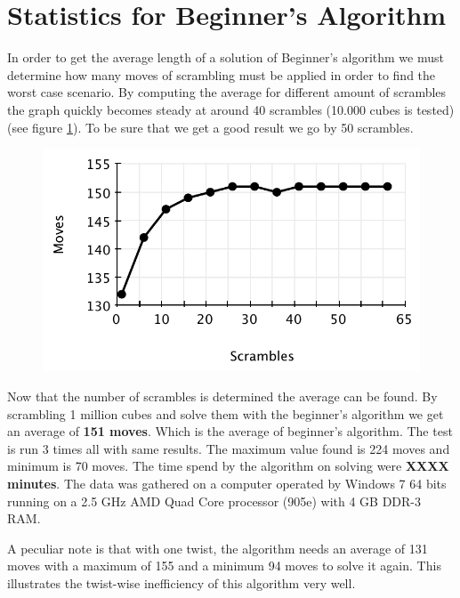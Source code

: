 \section{Statistics for Beginner's Algorithm}
\label{sec:beginnersStat}
In order to get the average length of a solution of Beginner's algorithm we must determine how many moves of scrambling must be applied in order to find the worst case scenario. 
By computing the average for different amount of scrambles the graph quickly becomes steady at around 40 scrambles (10.000 cubes is tested) (see figure \ref{fig:beginnersScramble}). To be sure that we get a good result we go by 50 scrambles.
\begin{figure}[htbp]
	\centering
		\includegraphics{input/pics/beginnersScramble.pdf}
	\caption{}
	\label{fig:beginnersScramble}
\end{figure}

Now that the number of scrambles is determined the average can be found.
By scrambling 1 million cubes and solve them with the beginner's algorithm we get an average of \textbf{151 moves}. 
Which is the average of beginner's algorithm. The test is run 3 times all with same results.
The maximum value found is 224 moves and minimum is 70 moves. 
The time spend by the algorithm on solving were \textbf{XXXX minutes}. 
The data was gathered on a computer operated by Windows 7 64 bits running on a 2.5 GHz AMD Quad Core processor (905e) with 4 GB DDR-3 RAM.

A peculiar note is that with one twist, the algorithm needs an average of 131 moves with a maximum of 155 and a minimum 94 moves to solve it again.
This illustrates the twist-wise inefficiency of this algorithm very well.

